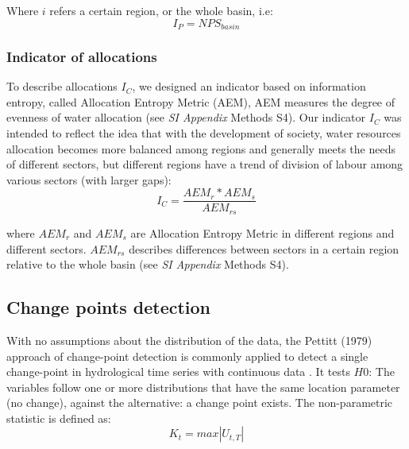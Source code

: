 	Where $i$ refers a certain region, or the whole basin, i.e:
	\begin{equation}
		I_P = NPS_{basin}
	\end{equation}

	\subsubsection*{Indicator of allocations}
	To describe allocations $I_C$, we designed an indicator based on information entropy, called Allocation Entropy Metric (AEM), AEM measures the degree of evenness of water allocation (see \textit{SI Appendix} Methods S4).
	Our indicator $I_C$ was intended to reflect the idea that with the development of society, water resources allocation becomes more balanced among regions and generally meets the needs of different sectors, but different regions have a trend of division of labour among various sectors (with larger gaps):
	\begin{equation}
		I_C = \frac{AEM_{r}*AEM_{s}}{AEM_{rs}}
	\end{equation}

	where $AEM_{r}$ and $AEM_{s}$ are Allocation Entropy Metric in different regions and different sectors. $AEM_{rs}$ describes differences between sectors in a certain region relative to the whole basin (see \textit{SI Appendix} Methods S4).

	\subsection{Change points detection}

		With no assumptions about the distribution of the data, the Pettitt (1979) approach of change-point detection is commonly applied to detect a single change-point in hydrological time series with continuous data
        \cite{pettittNonParametricApproachChangePoint1979}.
		It tests $H0$: The variables follow one or more distributions that have the same location parameter (no change), against the alternative: a change point exists. The non-parametric statistic is defined as:
		\begin{equation}
			K_t = max|U_{t, T}|
		\end{equation}

